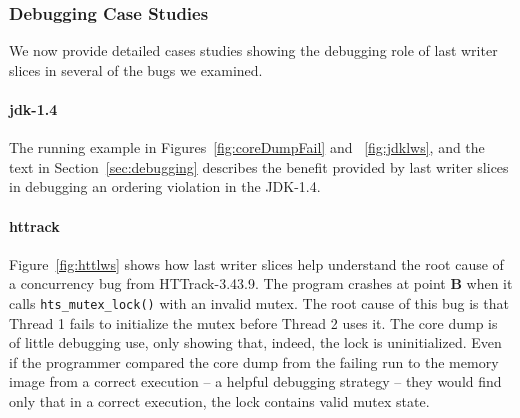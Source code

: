 \documentclass[preprint,9pt]{sigplanconf}
\begin{document}
\subsubsection{Debugging Case Studies}
\label{sec:eval:debugging:cases}

We now provide detailed cases studies showing the debugging role of last writer
slices in several of the bugs we examined.  



\paragraph{jdk-1.4}
The running example in Figures~\ref{fig:coreDumpFail} and ~\ref{fig:jdklws},
and the text in Section~\ref{sec:debugging} describes the benefit provided by
last writer slices in debugging an ordering violation in the JDK-1.4.

%


\paragraph{httrack}
Figure~\ref{fig:httlws} shows how last writer slices help understand the root
cause of a concurrency bug from HTTrack-3.43.9.  The program crashes at point
{\bf B} when it calls {\tt hts\_mutex\_lock()} with an invalid mutex.    The
root cause of this bug is that Thread 1 fails to initialize the mutex before
Thread 2 uses it.   The core dump is of little debugging use, only showing
that, indeed, the lock is uninitialized.  Even if the programmer compared the
core dump from the failing run to the memory image from a correct execution --
a helpful debugging strategy -- they would find only that in a correct
execution, the lock contains valid mutex state.
\end{document}
